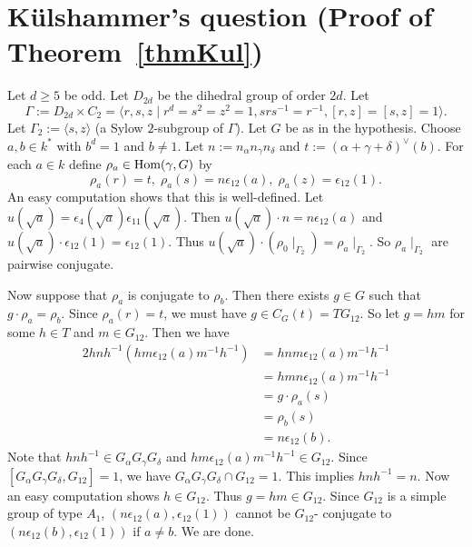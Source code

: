 \section{K\"ulshammer's question (Proof of Theorem~\ref{thmKul})}
Let $d\geq 5$ be odd. Let $D_{2d}$ be the dihedral group of order $2d$. Let 
\begin{equation*}
\Gamma:=D_{2d}\times C_2 =\langle r, s, z\mid r^d=s^2=z^2=1, srs^{-1}=r^{-1}, [r,z]=[s,z]=1\rangle.
\end{equation*}
Let $\Gamma_2:=\langle s, z\rangle$ (a Sylow $2$-subgroup of $\Gamma$). Let $G$ be as in the hypothesis. Choose $a, b\in k^{*}$ with $b^d=1$ and $b\neq 1$. Let $n:=n_\alpha n_\gamma n_\delta$ and $t:=(\alpha+\gamma+\delta)^{\vee}(b)$. For each $a\in k$ define $\rho_a\in \textup{Hom}(\gamma, G)$ by
\begin{equation*}
\rho_a(r)=t, \; \rho_a(s)=n \epsilon_{12}(a), \; \rho_a(z)=\epsilon_{12}(1). 
\end{equation*}
An easy computation shows that this is well-defined. 
Let $u(\sqrt a)=\epsilon_{4}(\sqrt a)\epsilon_{11}(\sqrt a)$. Then $u(\sqrt a)\cdot n = n\epsilon_{12}(a)$ and $u(\sqrt a)\cdot \epsilon_{12}(1) = \epsilon_{12}(1)$. Thus $u(\sqrt a)\cdot (\rho_0\mid_{\Gamma_2})=\rho_a\mid_{\Gamma_2}$. So $\rho_a\mid_{\Gamma_2}$ are pairwise conjugate. 

Now suppose that $\rho_a$ is conjugate to $\rho_b$. Then there exists $g\in G$ such that $g\cdot \rho_a=\rho_b$. Since $\rho_a(r)=t$, we must have $g\in C_G(t)=TG_{12}$. So let $g=hm$ for some $h\in T$ and $m\in G_{12}$. Then we have
\begin{alignat*}{2}
hnh^{-1}(hm\epsilon_{12}(a)m^{-1}h^{-1})&= hnm\epsilon_{12}(a)m^{-1}h^{-1}\\
                                                                 &= hmn\epsilon_{12}(a)m^{-1}h^{-1}\\
                                                                 &= g\cdot \rho_{a}(s)\\
                                                                 &= \rho_b(s)\\
                                                                 &= n\epsilon_{12}(b).
\end{alignat*}
Note that $hnh^{-1}\in G_\alpha G_\gamma G_\delta$ and $hm\epsilon_{12}(a)m^{-1}h^{-1}\in G_{12}$. Since $[G_\alpha G_\gamma G_\delta, G_{12}]=1$, we have $G_\alpha G_\gamma G_\delta \cap G_{12}=1$. This implies $hnh^{-1}=n$. Now an easy computation shows $h\in G_{12}$. Thus $g=hm\in G_{12}$. Since $G_{12}$ is a simple group of type $A_1$, $(n\epsilon_{12}(a), \epsilon_{12}(1))$ cannot be $G_{12}$- conjugate to $(n\epsilon_{12}(b), \epsilon_{12}(1))$ if $a\neq b$. We are done.                                                                 
